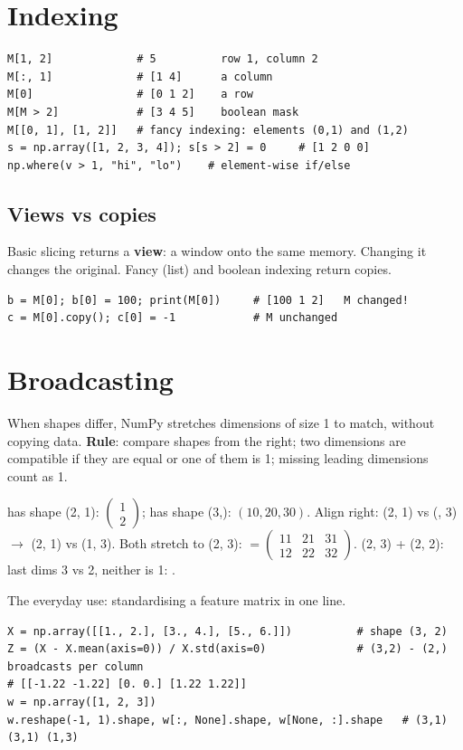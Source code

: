 \section{Indexing}
\begin{lstlisting}
M[1, 2]             # 5          row 1, column 2
M[:, 1]             # [1 4]      a column
M[0]                # [0 1 2]    a row
M[M > 2]            # [3 4 5]    boolean mask
M[[0, 1], [1, 2]]   # fancy indexing: elements (0,1) and (1,2)
s = np.array([1, 2, 3, 4]); s[s > 2] = 0     # [1 2 0 0]
np.where(v > 1, "hi", "lo")    # element-wise if/else
\end{lstlisting}

\subsection{Views vs copies}
Basic slicing returns a \textbf{view}: a window onto the same memory. Changing it changes the original. Fancy (list) and boolean indexing return copies.
\begin{lstlisting}
b = M[0]; b[0] = 100; print(M[0])     # [100 1 2]   M changed!
c = M[0].copy(); c[0] = -1            # M unchanged
\end{lstlisting}

\section{Broadcasting}
When shapes differ, NumPy stretches dimensions of size 1 to match, without copying data. \textbf{Rule}: compare shapes from the right; two dimensions are compatible
if they are equal or one of them is 1; missing leading dimensions count as 1.
\begin{example}
 has shape (2, 1): $\begin{pmatrix}1\\2\end{pmatrix}$;  has shape (3,): $(10, 20, 30)$. Align right: (2, 1) vs (, 3) $\to$ (2, 1) vs (1, 3).
Both stretch to (2, 3):  $= \begin{pmatrix}11 & 21 & 31\\12 & 22 & 32\end{pmatrix}$.
(2, 3) + (2, 2): last dims 3 vs 2, neither is 1: .
\end{example}
The everyday use: standardising a feature matrix in one line.
\begin{lstlisting}
X = np.array([[1., 2.], [3., 4.], [5., 6.]])          # shape (3, 2)
Z = (X - X.mean(axis=0)) / X.std(axis=0)              # (3,2) - (2,) broadcasts per column
# [[-1.22 -1.22] [0. 0.] [1.22 1.22]]
w = np.array([1, 2, 3])
w.reshape(-1, 1).shape, w[:, None].shape, w[None, :].shape   # (3,1) (3,1) (1,3)
\end{lstlisting}

